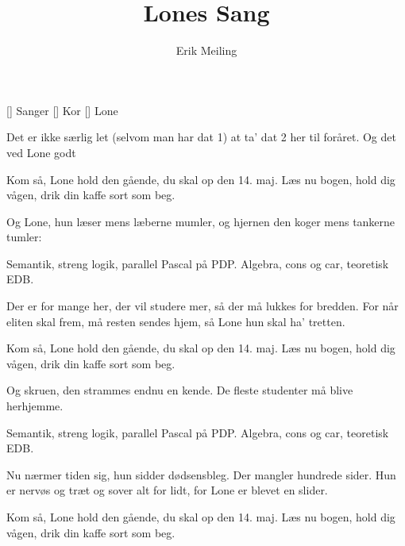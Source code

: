 \documentclass[a4paper,11pt]{article}
\title{Lones Sang}
\author{Erik Meiling}
\begin{document}
\maketitle

\begin{roles}
[] Sanger
[] Kor
[] Lone
\end{roles}

\begin{song}
     Det er ikke særlig let
              (selvom man har dat 1)
              at ta' dat 2 her til foråret.
              Og det ved Lone godt

     Kom så, Lone
              hold den gående,
              du skal op den 14. maj.
              Læs nu bogen,
              hold dig vågen,
              drik din kaffe sort som beg.

     Og Lone, hun læser
              mens læberne mumler,
              og hjernen den koger
              mens tankerne tumler:

     Semantik, streng logik,
                parallel Pascal på PDP.
                Algebra, cons og car,
                teoretisk EDB.

     Der er for mange her,
              der vil studere mer,
              så der må lukkes for bredden.
              For når eliten skal frem,
              må resten sendes hjem,
              så Lone hun skal ha' tretten.

     Kom så, Lone
              hold den gående,
              du skal op den 14. maj.
              Læs nu bogen,
              hold dig vågen,
              drik din kaffe sort som beg.

     Og skruen, den strammes
              endnu en kende.
              De fleste studenter
              må blive herhjemme.

     Semantik, streng logik,
                parallel Pascal på PDP.
                Algebra, cons og car,
                teoretisk EDB.

     Nu nærmer tiden sig,
              hun sidder dødsensbleg.
              Der mangler hundrede sider.
              Hun er nervøs og træt
              og sover alt for lidt,
              for Lone er blevet en slider.
    
     Kom så, Lone
              hold den gående,
              du skal op den 14. maj.
              Læs nu bogen,
              hold dig vågen,
              drik din kaffe sort som beg.


\end{song}
\end{document}
